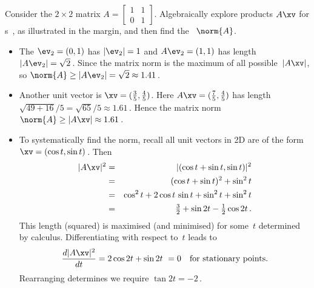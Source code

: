 \begin{example} \label{eg:}
Consider the \(2\times2\) matrix \(A=\begin{bmatrix} 1&1\\0&1 \end{bmatrix}\).
Algebraically explore products \(A\xv\) for s~\xv, as illustrated in the margin, 
and then find the ~\(\norm{A}\).
\begin{itemize}
\item The  \(\ev_2=(0,1)\) has \(|\ev_2|=1\) and \(A\ev_2=(1,1)\) has length \(|A\ev_2|=\sqrt2\)\,.
Since the matrix norm is the maximum of all possible~\(|A\xv|\), so \(\norm{A}\geq|A\ev_2|=\sqrt2\approx 1.41\)\,.
\item Another unit vector is \(\xv=(\tfrac35,\tfrac45)\).
Here \(A\xv=(\tfrac75,\tfrac45)\) has length \(\sqrt{49+16}/5=\sqrt{65}/5\approx1.61\)\,.
Hence the matrix norm \(\norm{A}\geq|A\xv|\approx 1.61\)\,.
\item To systematically find the norm, recall all unit vectors in 2D are of the form \(\xv=(\cos t,\sin t)\)\,.
Then
\begin{eqnarray*}
|A\xv|^2&=&|(\cos t+\sin t,\sin t)|^2
\\&=&(\cos t+\sin t)^2+\sin^2 t
\\&=&\cos^2 t+2\cos t\,\sin t+\sin^2t+\sin^2 t
\\&=&\tfrac32+\sin 2t-\tfrac12\cos 2t\,.
\end{eqnarray*}
This length (squared) is maximised (and minimised) for some~\(t\) determined by calculus.
Differentiating with respect to~\(t\)  leads to
\begin{equation*}
\frac{d|A\xv|^2}{dt}=2\cos2t+\sin 2t \ =0\quad\text{for stationary points.}
\end{equation*}
Rearranging determines we require \(\tan 2t=-2\)\,.

\end{itemize}
\end{example}
